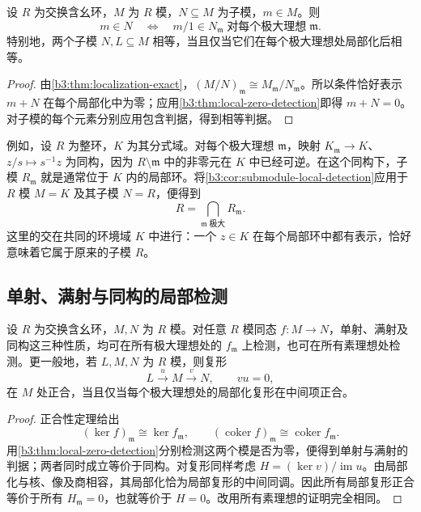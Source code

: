 \begin{corollary}\label{b3:cor:submodule-local-detection}
	设 \(R\) 为交换含幺环，\(M\) 为 \(R\) 模，\(N\subseteq M\) 为子模，\(m\in M\)。则
	\[
		m\in N\quad\Longleftrightarrow\quad m/1\in N_{\mathfrak m}\;\text{对每个极大理想}\;\mathfrak m.
	\]
	特别地，两个子模 \(N,L\subseteq M\) 相等，当且仅当它们在每个极大理想处局部化后相等。
\end{corollary}
\begin{proof}
	由\cref{b3:thm:localization-exact}，\((M/N)_{\mathfrak m}\cong M_{\mathfrak m}/N_{\mathfrak m}\)。所以条件恰好表示 \(m+N\) 在每个局部化中为零；应用\cref{b3:thm:local-zero-detection}即得 \(m+N=0\)。对子模的每个元素分别应用包含判据，得到相等判据。
\end{proof}

例如，设 \(R\) 为整环，\(K\) 为其分式域。对每个极大理想 \(\mathfrak m\)，映射 \(K_{\mathfrak m}\rightarrow K\)、\(z/s\mapsto s^{-1}z\) 为同构，因为 \(R\setminus\mathfrak m\) 中的非零元在 \(K\) 中已经可逆。在这个同构下，子模 \(R_{\mathfrak m}\) 就是通常位于 \(K\) 内的局部环。将\cref{b3:cor:submodule-local-detection}应用于 \(R\) 模 \(M=K\) 及其子模 \(N=R\)，便得到
\[
	R=\bigcap_{\mathfrak m\;\text{极大}}R_{\mathfrak m}.
\]
这里的交在共同的环境域 \(K\) 中进行：一个 \(z\in K\) 在每个局部环中都有表示，恰好意味着它属于原来的子模 \(R\)。

\subsection{单射、满射与同构的局部检测}
\label{b3:subsec:0204:02}

\begin{theorem}\label{b3:thm:local-morphism-detection}
	设 \(R\) 为交换含幺环，\(M,N\) 为 \(R\) 模。对任意 \(R\) 模同态 \(f:M\rightarrow N\)，单射、满射及同构这三种性质，均可在所有极大理想处的 \(f_{\mathfrak m}\) 上检测，也可在所有素理想处检测。更一般地，若 \(L,M,N\) 为 \(R\) 模，则复形
	\[
		L\xrightarrow{u}M\xrightarrow{v}N,\qquad vu=0,
	\]
	在 \(M\) 处正合，当且仅当每个极大理想处的局部化复形在中间项正合。
\end{theorem}
\begin{proof}
	正合性定理给出
	\[
		(\ker f)_{\mathfrak m}\cong\ker f_{\mathfrak m},\qquad (\operatorname{coker}f)_{\mathfrak m}\cong \operatorname{coker}f_{\mathfrak m}.
	\]
	用\cref{b3:thm:local-zero-detection}分别检测这两个模是否为零，便得到单射与满射的判据；两者同时成立等价于同构。对复形同样考虑 \(H=(\ker v)/\operatorname{im}u\)。由局部化与核、像及商相容，其局部化恰为局部复形的中间同调。因此所有局部复形正合等价于所有 \(H_{\mathfrak m}=0\)，也就等价于 \(H=0\)。改用所有素理想的证明完全相同。
\end{proof}


